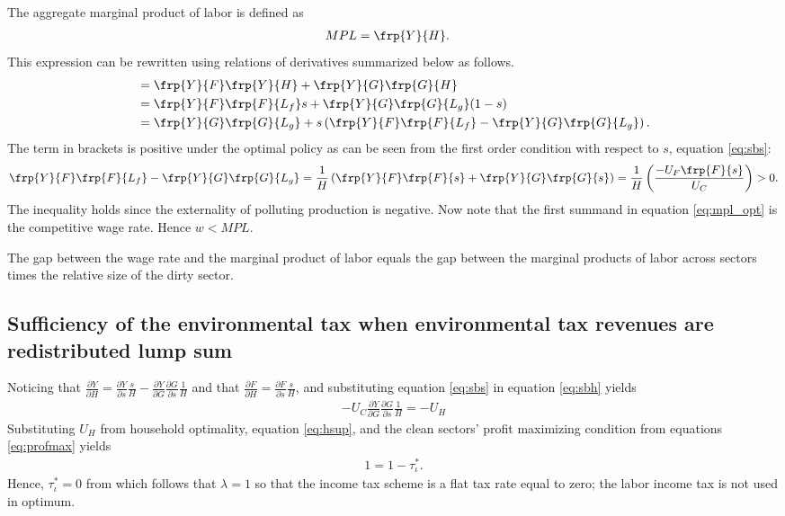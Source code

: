 The aggregate marginal product of labor is defined as
\begin{align}
MPL&= \frp{Y}{H}.
\end{align}
This expression can be rewritten using relations of derivatives summarized below as follows.
\begin{align}
&= \frp{Y}{F}\frp{Y}{H}+\frp{Y}{G}\frp{G}{H}\\
&= \frp{Y}{F}\frp{F}{L_f}s+\frp{Y}{G}\frp{G}{L_g}(1-s)\\
&= \frp{Y}{G}\frp{G}{L_g}+ s\left(\frp{Y}{F}\frp{F}{L_f}-\frp{Y}{G}\frp{G}{L_g}\right).\label{eq:mpl_opt}
\end{align}
The term in brackets is positive under the optimal policy as can be seen from the first order condition with respect to $s$, equation \ref{eq:sbs}:
\begin{align}
\frp{Y}{F}\frp{F}{L_f}-\frp{Y}{G}\frp{G}{L_g}=\frac{1}{H}\left(\frp{Y}{F}\frp{F}{s}+\frp{Y}{G}\frp{G}{s}\right)=\frac{1}{H}\left(\frac{-U_F\frp{F}{s}}{U_C}\right)>0.
\end{align}
The inequality holds since the externality of polluting production is negative. %
Now note that the first summand in equation \ref{eq:mpl_opt} is the competitive wage rate.  Hence $w<MPL$.

The gap between the wage rate and the marginal product of labor equals the gap between the marginal products of labor across sectors times the relative size of the dirty sector. 

\subsection{Sufficiency of the environmental tax when environmental tax revenues are redistributed lump sum}\label{app:incometax0}

Noticing that $\frac{\partial Y}{\partial H}= \frac{\partial Y}{\partial s}\frac{s}{H}-\frac{\partial Y}{\partial G}\frac{\partial G}{\partial s}\frac{1}{H}$ and that $\frac{\partial F}{\partial H}=\frac{\partial F}{\partial s}\frac{s}{H}$, and substituting equation \ref{eq:sbs} in equation \ref{eq:sbh} yields
\begin{align}\label{eq:pigou}
-U_C \frac{\partial Y}{\partial G}\frac{\partial G}{\partial s}\frac{1}{H}=-U_H
\end{align}
Substituting $U_H$ from household optimality, equation \ref{eq:hsup}, and the clean sectors' profit maximizing condition from equations \ref{eq:profmax} yields
\begin{align}
1=1-\tau^*_\iota.
\end{align}
Hence, $\tau^*_\iota =0$ from which follows that $\lambda =1$ so that the income tax scheme is a flat tax rate equal to zero; the labor income tax is not used in optimum.



